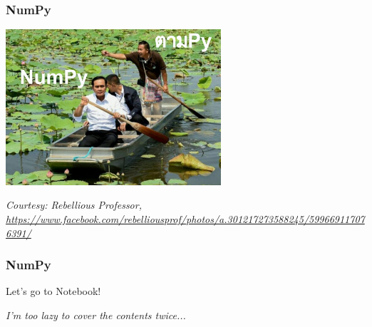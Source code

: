 \documentclass[aspectratio=169]{beamer}
\begin{document}
\begin{frame}
    \frametitle{NumPy}

    \centering
    \includegraphics[width=0.6\textwidth]{images/numpy-meme.jpg}

    {\scriptsize \textit{Courtesy: Rebellious Professor, \url{https://www.facebook.com/rebelliousprof/photos/a.301217273588245/599669117076391/}}}
\end{frame}

\begin{frame}
    \frametitle{NumPy}
    \centering
    { \Huge Let's go to Notebook! }

    \textit{I'm too lazy to cover the contents twice...}
\end{frame}
\end{document}
